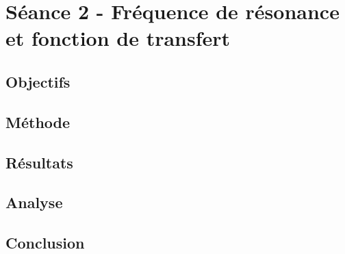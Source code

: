 

\section{Séance 2 - Fréquence de résonance et fonction de transfert}


\subsection{Objectifs}

\subsection{Méthode}

\subsection{Résultats}

\subsection{Analyse}

\subsection{Conclusion}
